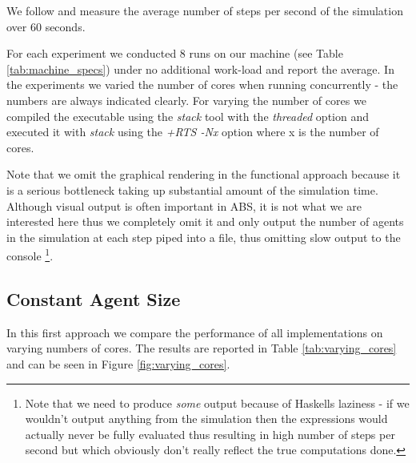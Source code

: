 We follow \cite{lysenko_framework_2008} and measure the average number of steps per second of the simulation over 60 seconds.

For each experiment we conducted 8 runs on our machine (see Table \ref{tab:machine_specs}) under no additional work-load and report the average. In the experiments we varied the number of cores when running concurrently - the numbers are always indicated clearly. For varying the number of cores we compiled the executable using the \textit{stack} tool with the \textit{threaded} option and executed it with \textit{stack} using the \textit{+RTS -Nx} option where x is the number of cores.

Note that we omit the graphical rendering in the functional approach because it is a serious bottleneck taking up substantial amount of the simulation time. Although visual output is often important in ABS, it is not what we are interested here thus we completely omit it and only output the number of agents in the simulation at each step piped into a file, thus omitting slow output to the console \footnote{Note that we need to produce \textit{some} output because of Haskells laziness - if we wouldn't output anything from the simulation then the expressions would actually never be fully evaluated thus resulting in high number of steps per second but which obviously don't really reflect the true computations done.}.

\subsection{Constant Agent Size}
In this first approach we compare the performance of all implementations on varying numbers of cores. The results are reported in Table \ref{tab:varying_cores} and can be seen in Figure \ref{fig:varying_cores}. 

